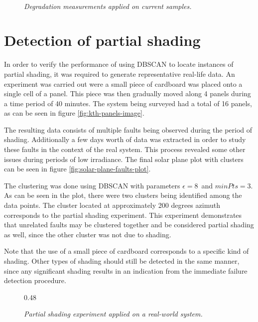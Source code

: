 \begin{figure}[here]
\centering
{}
~
\caption[Performance of distance-based method (current)]{\emph{Degradation measurements applied on current samples.}}
\end{figure}

\clearpage
\section{Detection of partial shading}
In order to verify the performance of using DBSCAN to locate instances of partial shading, it was required to generate representative real-life data.
An experiment was carried out were a small piece of cardboard was placed onto a single cell of a panel.
This piece was then gradually moved along 4 panels during a time period of 40 minutes.
The system being surveyed had a total of 16 panels, as can be seen in figure \ref{fig:kth-panels-image}.

The resulting data consists of multiple faults being observed during the period of shading.
Additionally a few days worth of data was extracted in order to study these faults in the context of the real system.
This process revealed some other issues during periods of low irradiance.
The final solar plane plot with clusters can be seen in figure \ref{fig:solar-plane-faults-plot}.

The clustering was done using DBSCAN with parameters $\epsilon = 8$ and $minPts = 3$.
As can be seen in the plot, there were two clusters being identified among the data points.
The cluster located at approximately 200 degrees azimuth corresponds to the partial shading experiment.
This experiment demonstrates that unrelated faults may be clustered together and be considered partial shading as well, since the other cluster was not due to shading.

Note that the use of a small piece of cardboard corresponds to a specific kind of shading.
Other types of shading should still be detected in the same manner, since any significant shading results in an indication from the immediate failure detection procedure.

\begin{figure}[here]
\centering
{}
{0.48}
~
\caption[Partial shading experiment]{\emph{Partial shading experiment applied on a real-world system.}}
\end{figure}

